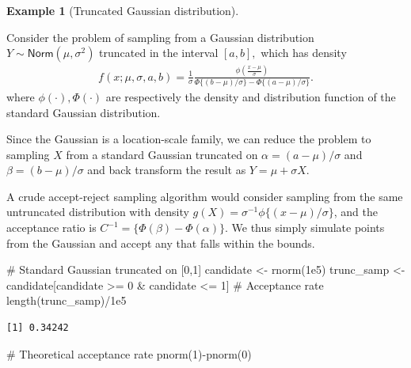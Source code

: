\documentclass[
  11pt,
  letterpaper,
]{scrbook}
\newenvironment{Shaded}{\begin{snugshade}}{\end{snugshade}}
\newcommand{\CommentTok}[1]{\textcolor[rgb]{0.37,0.37,0.37}{#1}}
\newcommand{\DecValTok}[1]{\textcolor[rgb]{0.68,0.00,0.00}{#1}}
\newcommand{\FloatTok}[1]{\textcolor[rgb]{0.68,0.00,0.00}{#1}}
\newcommand{\FunctionTok}[1]{\textcolor[rgb]{0.28,0.35,0.67}{#1}}
\newcommand{\NormalTok}[1]{\textcolor[rgb]{0.00,0.23,0.31}{#1}}
\newcommand{\OtherTok}[1]{\textcolor[rgb]{0.00,0.23,0.31}{#1}}
\newcommand{\SpecialCharTok}[1]{\textcolor[rgb]{0.37,0.37,0.37}{#1}}
\theoremstyle{definition}
\newtheorem{example}{Example}[chapter]
\theoremstyle{definition}
\theoremstyle{definition}
\theoremstyle{plain}
\theoremstyle{remark}
\begin{document}
\begin{example}[Truncated Gaussian
distribution]\protect\hypertarget{exm-accept-reject-truncated}{}\label{exm-accept-reject-truncated}

Consider the problem of sampling from a Gaussian distribution
\(Y \sim \mathsf{Norm}(\mu, \sigma^2)\) truncated in the interval
\([a, b],\) which has density \begin{align*}
f(x; \mu, \sigma, a, b) = \frac{1}{\sigma}\frac{\phi\left(\frac{x-\mu}{\sigma}\right)}{\Phi\{(b-\mu)/\sigma\}-\Phi\{(a-\mu)/\sigma\}}.
\end{align*} where \(\phi(\cdot), \Phi(\cdot)\) are respectively the
density and distribution function of the standard Gaussian distribution.

Since the Gaussian is a location-scale family, we can reduce the problem
to sampling \(X\) from a standard Gaussian truncated on
\(\alpha = (a-\mu)/\sigma\) and \(\beta = (b-\mu)/\sigma\) and back
transform the result as \(Y = \mu + \sigma X\).

A crude accept-reject sampling algorithm would consider sampling from
the same untruncated distribution with density
\(g(X) = \sigma^{-1}\phi\{(x-\mu)/\sigma\}\), and the acceptance ratio
is \(C^{-1}=\{\Phi(\beta) - \Phi(\alpha)\}\). We thus simply simulate
points from the Gaussian and accept any that falls within the bounds.

\begin{Shaded}
\begin{Highlighting}[]
\CommentTok{\# Standard Gaussian truncated on [0,1]}
\NormalTok{candidate }\OtherTok{\textless{}{-}} \FunctionTok{rnorm}\NormalTok{(}\FloatTok{1e5}\NormalTok{)}
\NormalTok{trunc\_samp }\OtherTok{\textless{}{-}}\NormalTok{ candidate[candidate }\SpecialCharTok{\textgreater{}=} \DecValTok{0} \SpecialCharTok{\&}\NormalTok{ candidate }\SpecialCharTok{\textless{}=} \DecValTok{1}\NormalTok{]}
\CommentTok{\# Acceptance rate}
\FunctionTok{length}\NormalTok{(trunc\_samp)}\SpecialCharTok{/}\FloatTok{1e5}
\end{Highlighting}
\end{Shaded}

\begin{verbatim}
[1] 0.34242
\end{verbatim}

\begin{Shaded}
\begin{Highlighting}[]
\CommentTok{\# Theoretical acceptance rate}
\FunctionTok{pnorm}\NormalTok{(}\DecValTok{1}\NormalTok{)}\SpecialCharTok{{-}}\FunctionTok{pnorm}\NormalTok{(}\DecValTok{0}\NormalTok{)}
\end{Highlighting}
\end{Shaded}


\end{example}
\end{document}
